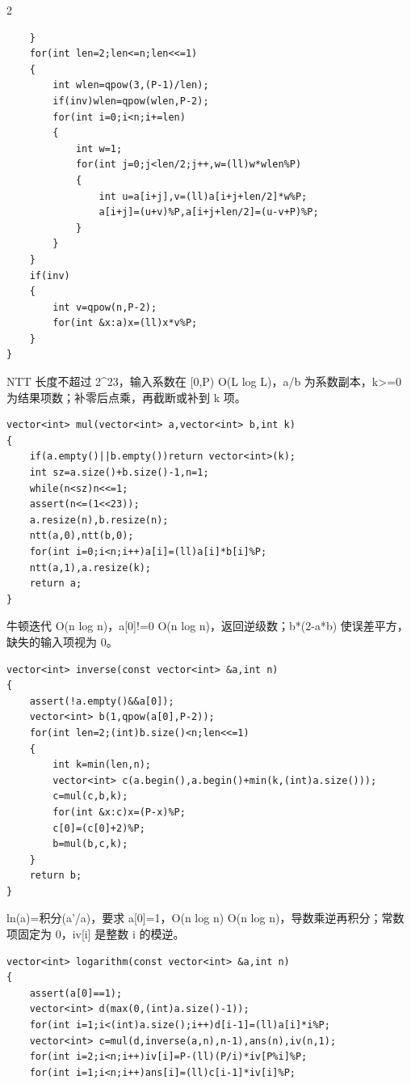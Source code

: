\documentclass[UTF8,fontset=fandol,a4paper,twoside]{ctexart}
\newcommand{\note}[1]{{\fontsize{10}{12}\selectfont #1\par}}
\begin{document}
\begin{multicols}{2}
\begin{lstlisting}
    }
    for(int len=2;len<=n;len<<=1)
    {
        int wlen=qpow(3,(P-1)/len);
        if(inv)wlen=qpow(wlen,P-2);
        for(int i=0;i<n;i+=len)
        {
            int w=1;
            for(int j=0;j<len/2;j++,w=(ll)w*wlen%P)
            {
                int u=a[i+j],v=(ll)a[i+j+len/2]*w%P;
                a[i+j]=(u+v)%P,a[i+j+len/2]=(u-v+P)%P;
            }
        }
    }
    if(inv)
    {
        int v=qpow(n,P-2);
        for(int &x:a)x=(ll)x*v%P;
    }
}
\end{lstlisting}
\note{NTT 长度不超过 2\textasciicircum{}23，输入系数在 [\allowbreak{}0,\allowbreak{}P)\allowbreak{} O(\allowbreak{}L log L)\allowbreak{}，a/\allowbreak{}b 为系数副本，k>\allowbreak{}=\allowbreak{}0 为结果项数；补零后点乘，再截断或补到 k 项。}
\begin{lstlisting}
vector<int> mul(vector<int> a,vector<int> b,int k)
{
    if(a.empty()||b.empty())return vector<int>(k);
    int sz=a.size()+b.size()-1,n=1;
    while(n<sz)n<<=1;
    assert(n<=(1<<23));
    a.resize(n),b.resize(n);
    ntt(a,0),ntt(b,0);
    for(int i=0;i<n;i++)a[i]=(ll)a[i]*b[i]%P;
    ntt(a,1),a.resize(k);
    return a;
}
\end{lstlisting}
\note{牛顿迭代 O(\allowbreak{}n log n)\allowbreak{}，a[\allowbreak{}0]\allowbreak{}!=\allowbreak{}0 O(\allowbreak{}n log n)\allowbreak{}，返回逆级数；b*(\allowbreak{}2-\allowbreak{}a*b)\allowbreak{} 使误差平方，缺失的输入项视为 0。}
\begin{lstlisting}
vector<int> inverse(const vector<int> &a,int n)
{
    assert(!a.empty()&&a[0]);
    vector<int> b(1,qpow(a[0],P-2));
    for(int len=2;(int)b.size()<n;len<<=1)
    {
        int k=min(len,n);
        vector<int> c(a.begin(),a.begin()+min(k,(int)a.size()));
        c=mul(c,b,k);
        for(int &x:c)x=(P-x)%P;
        c[0]=(c[0]+2)%P;
        b=mul(b,c,k);
    }
    return b;
}
\end{lstlisting}
\note{ln(\allowbreak{}a)\allowbreak{}=\allowbreak{}积分(\allowbreak{}a'/\allowbreak{}a)\allowbreak{}，要求 a[\allowbreak{}0]\allowbreak{}=\allowbreak{}1，O(\allowbreak{}n log n)\allowbreak{} O(\allowbreak{}n log n)\allowbreak{}，导数乘逆再积分；常数项固定为 0，iv[\allowbreak{}i]\allowbreak{} 是整数 i 的模逆。}
\begin{lstlisting}
vector<int> logarithm(const vector<int> &a,int n)
{
    assert(a[0]==1);
    vector<int> d(max(0,(int)a.size()-1));
    for(int i=1;i<(int)a.size();i++)d[i-1]=(ll)a[i]*i%P;
    vector<int> c=mul(d,inverse(a,n),n-1),ans(n),iv(n,1);
    for(int i=2;i<n;i++)iv[i]=P-(ll)(P/i)*iv[P%i]%P;
    for(int i=1;i<n;i++)ans[i]=(ll)c[i-1]*iv[i]%P;

\end{lstlisting}
\end{multicols}
\end{document}
